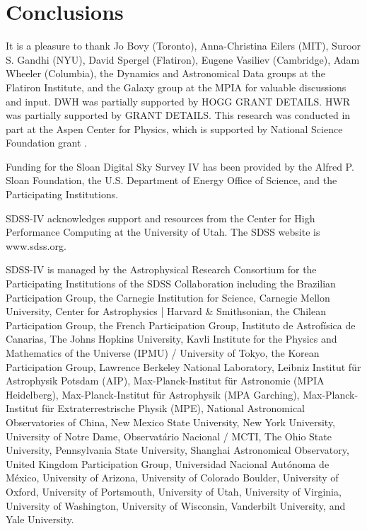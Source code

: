 \documentclass[modern]{aastex63}
\begin{document}

\section{Conclusions}
\label{sec:conclusions}



\acknowledgments
It is a pleasure to thank
  Jo Bovy (Toronto),
  Anna-Christina Eilers (MIT),
  Suroor S. Gandhi (NYU),
  David Spergel (Flatiron),
  Eugene Vasiliev (Cambridge),
  Adam Wheeler (Columbia),
  the Dynamics and Astronomical Data groups at the Flatiron Institute,
  and the Galaxy group at the MPIA
for valuable discussions and input.
DWH was partially supported by HOGG GRANT DETAILS.
HWR was partially supported by GRANT DETAILS.
This research was conducted in part at the Aspen Center for Physics,
which is supported by National Science Foundation grant .

Funding for the Sloan Digital Sky
Survey IV has been provided by the
Alfred P. Sloan Foundation, the U.S.
Department of Energy Office of
Science, and the Participating
Institutions.

SDSS-IV acknowledges support and
resources from the Center for High
Performance Computing  at the
University of Utah. The SDSS
website is www.sdss.org.

SDSS-IV is managed by the
Astrophysical Research Consortium
for the Participating Institutions
of the SDSS Collaboration including
the Brazilian Participation Group,
the Carnegie Institution for Science,
Carnegie Mellon University, Center for
Astrophysics | Harvard \&
Smithsonian, the Chilean Participation
Group, the French Participation Group,
Instituto de Astrof\'isica de
Canarias, The Johns Hopkins
University, Kavli Institute for the
Physics and Mathematics of the
Universe (IPMU) / University of
Tokyo, the Korean Participation Group,
Lawrence Berkeley National Laboratory,
Leibniz Institut f\"ur Astrophysik
Potsdam (AIP),  Max-Planck-Institut
f\"ur Astronomie (MPIA Heidelberg),
Max-Planck-Institut f\"ur
Astrophysik (MPA Garching),
Max-Planck-Institut f\"ur
Extraterrestrische Physik (MPE),
National Astronomical Observatories of
China, New Mexico State University,
New York University, University of
Notre Dame, Observat\'ario
Nacional / MCTI, The Ohio State
University, Pennsylvania State
University, Shanghai
Astronomical Observatory, United
Kingdom Participation Group,
Universidad Nacional Aut\'onoma
de M\'exico, University of Arizona,
University of Colorado Boulder,
University of Oxford, University of
Portsmouth, University of Utah,
University of Virginia, University
of Washington, University of
Wisconsin, Vanderbilt University,
and Yale University.
\end{document}
